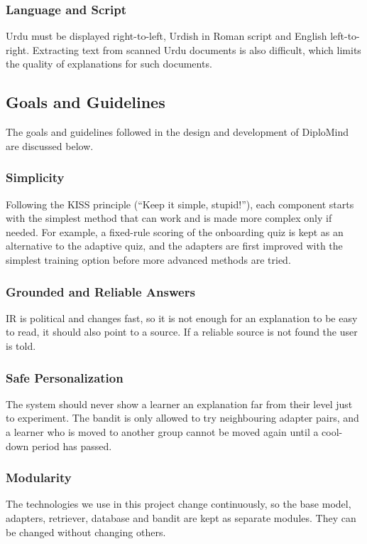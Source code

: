\documentclass{FastFyp}
\begin{document}
\subsubsection{Language and Script}
Urdu must be displayed right-to-left, Urdish in Roman script and English left-to-right. Extracting text from scanned Urdu documents is also difficult, which limits the quality of explanations for such documents.
 
\subsection{Goals and Guidelines}
The goals and guidelines followed in the design and development of DiploMind are discussed below.
 
\subsubsection{Simplicity}
Following the KISS principle (``Keep it simple, stupid!''), each component starts with the simplest method that can work and is made more complex only if needed. For example, a fixed-rule scoring of the onboarding quiz is kept as an alternative to the adaptive quiz, and the adapters are first improved with the simplest training option before more advanced methods are tried.
 
\subsubsection{Grounded and Reliable Answers}
IR is political and changes fast, so it is not enough for an explanation to be easy to read, it should also point to a source. If a reliable source is not found the user is told.
 
\subsubsection{Safe Personalization}
The system should never show a learner an explanation far from their level just to experiment. The bandit is only allowed to try neighbouring adapter pairs, and a learner who is moved to another group cannot be moved again until a cool-down period has passed.
 
\subsubsection{Modularity}
The technologies we use in this project change continuously, so the base model, adapters, retriever, database and bandit are kept as separate modules. They can be changed without changing others.
 
\end{document}
